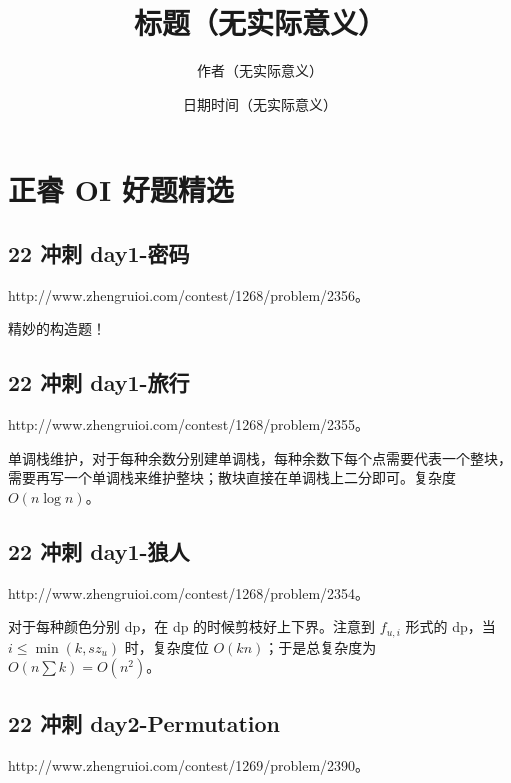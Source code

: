 \documentclass[UTF8,12pt,a4paper]{ctexart}
\title{标题（无实际意义）}
\author{作者（无实际意义）}
\date{日期时间（无实际意义）}
\begin{document}
	\fontsize{12pt}{12pt}\selectfont
	
	\newpage
	\pagestyle{fancy}
	
	
	\section*{正睿 OI 好题精选}

	\subsection*{22 冲刺 day1-密码}
	
	http://www.zhengruioi.com/contest/1268/problem/2356。
	
	精妙的构造题！
	
	\subsection*{22 冲刺 day1-旅行}
	
	http://www.zhengruioi.com/contest/1268/problem/2355。
	
	单调栈维护，对于每种余数分别建单调栈，每种余数下每个点需要代表一个整块，需要再写一个单调栈来维护整块；散块直接在单调栈上二分即可。复杂度 $O(n\log n)$。
	
	\subsection*{22 冲刺 day1-狼人}
	
	http://www.zhengruioi.com/contest/1268/problem/2354。
	
	对于每种颜色分别 dp，在 dp 的时候剪枝好上下界。注意到 $f_{u,i}$ 形式的 dp，当 $i\le \min(k,sz_u)$ 时，复杂度位 $O(kn)$；于是总复杂度为 $O(n\sum k)=O(n^2)$。
	
	\subsection*{22 冲刺 day2-Permutation}
	
	http://www.zhengruioi.com/contest/1269/problem/2390。
	
\end{document}
